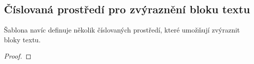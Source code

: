 \clearpage

\subsection{Číslovaná prostředí pro zvýraznění bloku textu}

Šablona navíc definuje několik číslovaných prostředí, které umožňují zvýraznit bloky textu.

\begin{definition}
\lipsum[1][1]
\end{definition}

\begin{example}
\lipsum[1][2]
\end{example}

\begin{theorem}
\lipsum[1][3]
\end{theorem}

\begin{proof}
\lipsum[1][4]
\end{proof}

\begin{corollary}
\lipsum[2][1]
\end{corollary}

\begin{proposition}
\lipsum[2][2]
\end{proposition}

\begin{note}
\lipsum[2][3]
\end{note}

\begin{remark}
\lipsum[2][4]
\end{remark}

\begin{lemma}
\lipsum[2][5]
\end{lemma}

\clearpage


